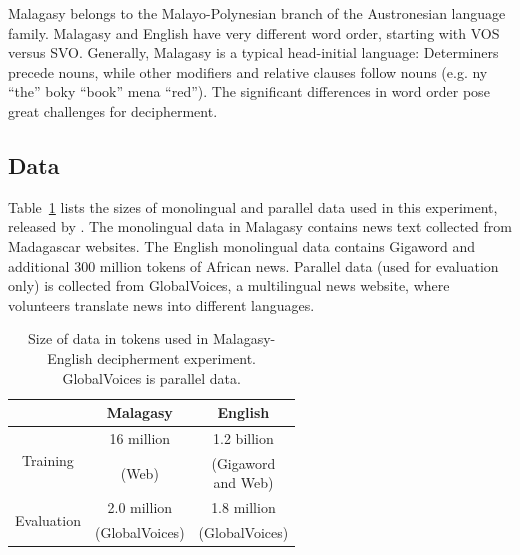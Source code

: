 
Malagasy belongs to the Malayo-Polynesian branch of the Austronesian language family. Malagasy and English have very different word order, starting with VOS versus SVO. Generally, Malagasy is a typical head-initial language: Determiners precede nouns, while other modifiers and relative clauses follow nouns (e.g. ny ``the'' boky ``book'' mena ``red''). The significant differences in word order pose great challenges for decipherment.


\subsection{Data}

Table~\ref{mlg-en-data} lists the sizes of monolingual and parallel data used in this experiment, released by . The monolingual data in Malagasy contains news text collected from Madagascar websites. The English monolingual data contains Gigaword and additional 300 million tokens of African news. Parallel data (used for evaluation only) is collected from GlobalVoices, a multilingual news website, where volunteers translate news into different languages.

 \begin{table}
 \begin{center}
 \begin{tabular}{ |c|c|c| } \hline
             & Malagasy & English \\ \hline
\multirow{2}{*}{Training} & 16 million & 1.2 billion\\ 
& (Web) & \pbox{2cm}{ (Gigaword \\ and Web)}  \\ \hline
\multirow{2}{*}{Evaluation} & 2.0 million& 1.8 million \\
 & (GlobalVoices) & (GlobalVoices)  \\ \hline
 \end{tabular}
 \caption{Size of data in tokens used in Malagasy-English decipherment experiment. GlobalVoices is parallel data.}
 \label{mlg-en-data}
 \end{center}
 \end{table}
 
